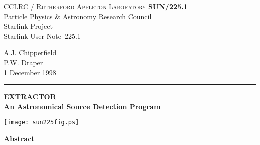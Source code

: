 \documentclass[twoside,11pt]{article}
\newcommand{\stardoccategory}  {Starlink User Note}
\newcommand{\stardocinitials}  {SUN}
\newcommand{\stardocnumber}    {225.1}
\newcommand{\stardocauthors}   {A.J. Chipperfield\\
                                P.W. Draper}
\newcommand{\stardocdate}      {1 December 1998}
\newcommand{\stardoctitle}     {EXTRACTOR\\
                                An Astronomical Source Detection Program}
\newcommand{\stardocname}{\stardocinitials /\stardocnumber}
\newenvironment{latexonly}{}{}
\renewcommand{\_}{\texttt{\symbol{95}}}
\begin{document}
\thispagestyle{empty}

\begin{latexonly}
   CCLRC / \textsc{Rutherford Appleton Laboratory} \hfill \textbf{\stardocname}\\
   {\large Particle Physics \& Astronomy Research Council}\\
   {\large Starlink Project\\}
   {\large \stardoccategory\ \stardocnumber}
   \begin{flushright}
   \stardocauthors\\
   \stardocdate
   \end{flushright}
   \vspace{-4mm}
   \rule{\textwidth}{0.5mm}
   \vspace{4mm}
   \begin{center}
   {\LARGE\textbf{\stardoctitle} \\ [2.5ex]}
   \vspace{4mm}

   \texttt{[image: sun225fig.ps]}
   \end{center}

   \vspace{5mm}
   \begin{center}
      {\Large\textbf{Abstract}}
   \end{center}
\end{latexonly}
\end{document}
